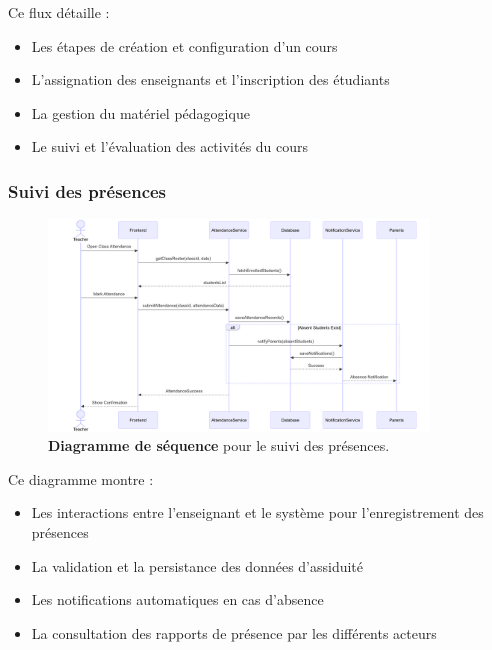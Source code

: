 Ce flux détaille :

\begin{itemize}
  \item Les étapes de création et configuration d'un cours
  
  \item L'assignation des enseignants et l'inscription des étudiants
  
  \item La gestion du matériel pédagogique
  
  \item Le suivi et l'évaluation des activités du cours
\end{itemize}

\subsubsection{Suivi des présences}

\begin{figure}[H]
  \centering
  \includegraphics[width=0.9\textwidth,keepaspectratio]{pfe-pics/diagrames/Attendance Tracking.png}
  \caption{\textbf{Diagramme de séquence} pour le suivi des présences.}
  \label{fig:attendance_tracking}
\end{figure}

Ce diagramme montre :

\begin{itemize}
  \item Les interactions entre l'enseignant et le système pour l'enregistrement des présences
  
  \item La validation et la persistance des données d'assiduité
  
  \item Les notifications automatiques en cas d'absence
  
  \item La consultation des rapports de présence par les différents acteurs
\end{itemize}

